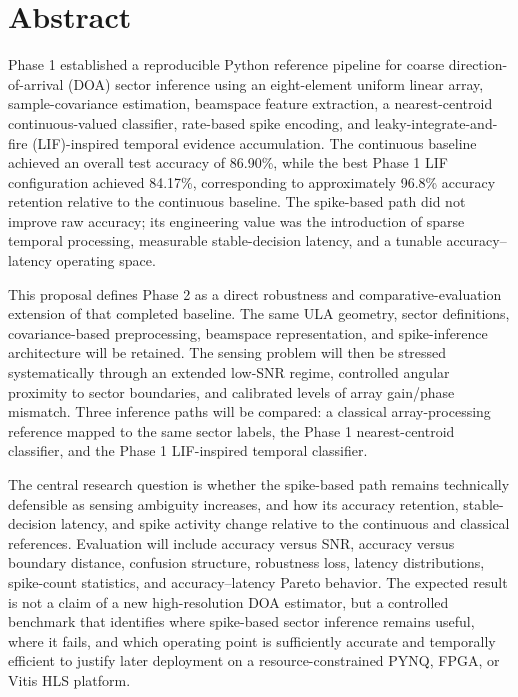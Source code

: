 \chapter*{Abstract}

Phase 1 established a reproducible Python reference pipeline for coarse direction-of-arrival (DOA) sector inference using an eight-element uniform linear array, sample-covariance estimation, beamspace feature extraction, a nearest-centroid continuous-valued classifier, rate-based spike encoding, and leaky-integrate-and-fire (LIF)-inspired temporal evidence accumulation. The continuous baseline achieved an overall test accuracy of 86.90\%, while the best Phase 1 LIF configuration achieved 84.17\%, corresponding to approximately 96.8\% accuracy retention relative to the continuous baseline. The spike-based path did not improve raw accuracy; its engineering value was the introduction of sparse temporal processing, measurable stable-decision latency, and a tunable accuracy--latency operating space.

This proposal defines Phase 2 as a direct robustness and comparative-evaluation extension of that completed baseline. The same ULA geometry, sector definitions, covariance-based preprocessing, beamspace representation, and spike-inference architecture will be retained. The sensing problem will then be stressed systematically through an extended low-SNR regime, controlled angular proximity to sector boundaries, and calibrated levels of array gain/phase mismatch. Three inference paths will be compared: a classical array-processing reference mapped to the same sector labels, the Phase 1 nearest-centroid classifier, and the Phase 1 LIF-inspired temporal classifier.

The central research question is whether the spike-based path remains technically defensible as sensing ambiguity increases, and how its accuracy retention, stable-decision latency, and spike activity change relative to the continuous and classical references. Evaluation will include accuracy versus SNR, accuracy versus boundary distance, confusion structure, robustness loss, latency distributions, spike-count statistics, and accuracy--latency Pareto behavior. The expected result is not a claim of a new high-resolution DOA estimator, but a controlled benchmark that identifies where spike-based sector inference remains useful, where it fails, and which operating point is sufficiently accurate and temporally efficient to justify later deployment on a resource-constrained PYNQ, FPGA, or Vitis HLS platform.